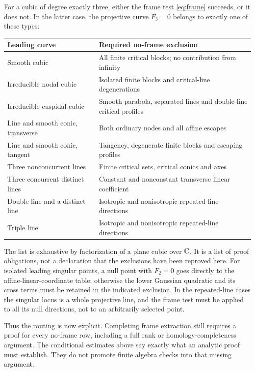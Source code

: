For a cubic of degree exactly three, either the frame test
\eqref{eq:frame} succeeds, or it does not. In the latter case,
the projective curve $F_3=0$ belongs to exactly one of these types:
\begin{center}\small
\begin{tabular}{@{}p{}p{}@{}}
\toprule
Leading curve & Required no-frame exclusion\\
\midrule
Smooth cubic & All finite critical blocks; no contribution from infinity\\
Irreducible nodal cubic & Isolated finite blocks and critical-line degenerations\\
Irreducible cuspidal cubic & Smooth parabola, separated lines and double-line critical profiles\\
Line and smooth conic, transverse & Both ordinary nodes and all affine escapes\\
Line and smooth conic, tangent & Tangency, degenerate finite blocks and escaping profiles\\
Three nonconcurrent lines & Finite critical sets, critical conics and axes\\
Three concurrent distinct lines & Constant and nonconstant transverse linear coefficient\\
Double line and a distinct line & Isotropic and nonisotropic repeated-line directions\\
Triple line & Isotropic and nonisotropic repeated-line directions\\
\bottomrule
\end{tabular}
\end{center}
The list is exhaustive by factorization of a plane cubic over $\mathbb C$.
It is a list of proof obligations, not a declaration that the exclusions
have been reproved here. For isolated leading singular points, a null
point with $F_2=0$ goes directly to the affine-linear-coordinate table;
otherwise the lower Gaussian quadratic and its cross terms must be
retained in the indicated exclusion. In the repeated-line cases the
singular locus is a whole projective line, and the frame test must be
applied to all its null directions, not to an arbitrarily selected point.

Thus the routing is now explicit. Completing frame extraction still
requires a proof for every no-frame row, including a full rank or
homology-completeness argument. The conditional estimates above say
exactly what an analytic proof must establish. They do not promote
finite algebra checks into that missing argument.
